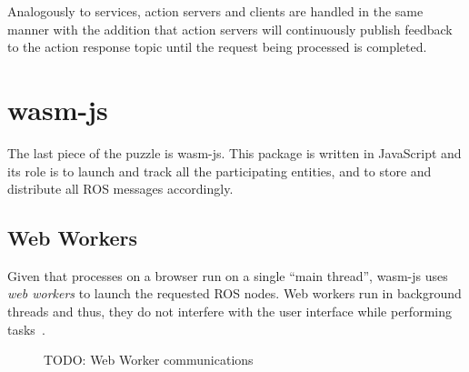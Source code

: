     Analogously to services, action servers and clients are handled in the same manner with the addition that action servers will continuously publish feedback to the action response topic until the request being processed is completed.




    \section{wasm-js}

        The last piece of the puzzle is \textsf{wasm-js}. This package is written in JavaScript and its role is to launch and track all the participating entities, and to store and distribute all \ac{ROS} messages accordingly.


    \subsection{Web Workers}

        Given that processes on a browser run on a single ``main thread'', \textsf{wasm-js} uses \textit{web workers} to launch the requested \ac{ROS} nodes. Web workers run in background threads and thus, they do not interfere with the user interface while performing tasks~\cite{workers}. 

        \begin{figure}[htbp]
            \centering
            \caption{TODO: Web Worker communications}
            \label{fig:webworker}
        \end{figure}

